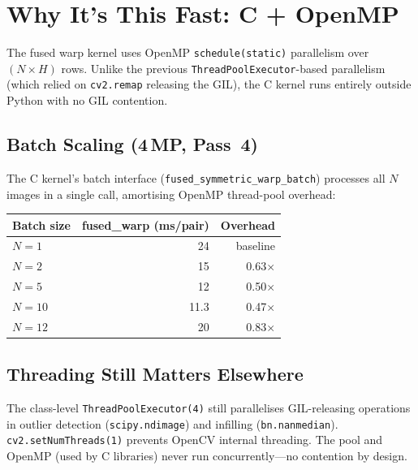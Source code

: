 \documentclass[10pt,a4paper,twocolumn]{article}
\begin{document}
\section{Why It's This Fast: C + OpenMP}

The fused warp kernel uses OpenMP \texttt{schedule(static)} parallelism over $(N \times H)$ rows. Unlike the previous \texttt{ThreadPoolExecutor}-based parallelism (which relied on \texttt{cv2.remap} releasing the GIL), the C kernel runs entirely outside Python with no GIL contention.

\subsection{Batch Scaling (4\,MP, Pass~4)}

The C kernel's batch interface (\texttt{fused\_symmetric\_warp\_batch}) processes all $N$ images in a single call, amortising OpenMP thread-pool overhead:

\begin{center}
\small
\begin{tabular}{@{}lrr@{}}
\toprule
\textbf{Batch size} & \textbf{fused\_warp (ms/pair)} & \textbf{Overhead} \\
\midrule
$N=1$  & 24 & baseline \\
$N=2$  & 15 & 0.63$\times$ \\
$N=5$  & 12 & 0.50$\times$ \\
$N=10$ & 11.3 & 0.47$\times$ \\
$N=12$ & 20 & 0.83$\times$ \\
\bottomrule
\end{tabular}
\end{center}

\subsection{Threading Still Matters Elsewhere}

The class-level \texttt{ThreadPoolExecutor(4)} still parallelises GIL-releasing operations in outlier detection (\texttt{scipy.ndimage}) and infilling (\texttt{bn.nanmedian}). \texttt{cv2.setNumThreads(1)} prevents OpenCV internal threading. The pool and OpenMP (used by C libraries) never run concurrently---no contention by design.
\end{document}
